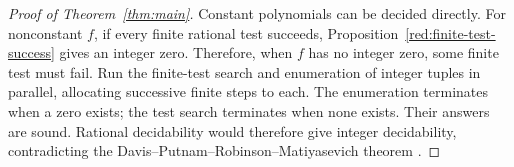 \begin{proof}[Proof of Theorem~\ref{thm:main}]
Constant polynomials can be decided directly. For nonconstant $f$,
if every finite rational test succeeds,
Proposition~\ref{red:finite-test-success} gives an integer zero. Therefore,
when $f$ has no integer zero, some finite test must fail. Run the
finite-test search and enumeration of integer tuples in parallel,
allocating successive finite steps to each. The enumeration terminates
when a zero exists; the test search terminates when none exists.
Their answers are sound. Rational decidability would therefore give
integer decidability, contradicting the Davis--Putnam--Robinson--Matiyasevich
theorem \cite{DavisPutnamRobinson1961,Matiyasevich1970}.
\end{proof}

